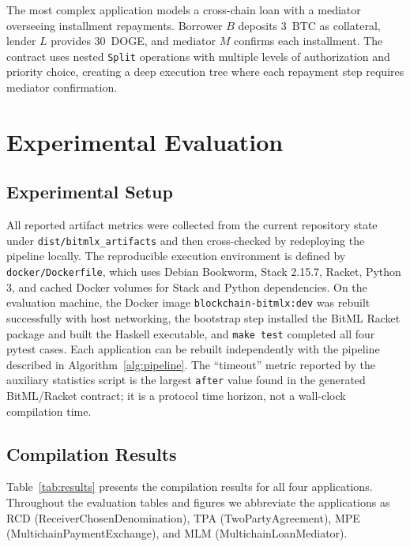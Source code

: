 \documentclass[journal]{IEEEtran}
\begin{document}
The most complex application models a cross-chain loan with a mediator overseeing installment repayments. Borrower $B$ deposits 3~BTC as collateral, lender $L$ provides 30~DOGE, and mediator $M$ confirms each installment. The contract uses nested \texttt{Split} operations with multiple levels of authorization and priority choice, creating a deep execution tree where each repayment step requires mediator confirmation.


\section{Experimental Evaluation}

\subsection{Experimental Setup}

All reported artifact metrics were collected from the current repository state under \texttt{dist/bitmlx\_artifacts} and then cross-checked by redeploying the pipeline locally. The reproducible execution environment is defined by \texttt{docker/Dockerfile}, which uses Debian Bookworm, Stack 2.15.7, Racket, Python 3, and cached Docker volumes for Stack and Python dependencies. On the evaluation machine, the Docker image \texttt{blockchain-bitmlx:dev} was rebuilt successfully with host networking, the bootstrap step installed the BitML Racket package and built the Haskell executable, and \texttt{make test} completed all four pytest cases. Each application can be rebuilt independently with the pipeline described in Algorithm~\ref{alg:pipeline}. The ``timeout'' metric reported by the auxiliary statistics script is the largest \texttt{after} value found in the generated BitML/Racket contract; it is a protocol time horizon, not a wall-clock compilation time.

\subsection{Compilation Results}

Table~\ref{tab:results} presents the compilation results for all four applications. Throughout the evaluation tables and figures we abbreviate the applications as RCD (ReceiverChosenDenomination), TPA (TwoPartyAgreement), MPE (MultichainPaymentExchange), and MLM (MultichainLoanMediator).
\end{document}
